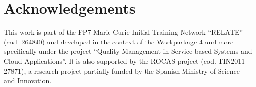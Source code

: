 \documentclass{llncs}
\begin{document}
% 
% 

\section{Acknowledgements}
This work is part of the FP7 Marie Curie Initial Training Network ``RELATE'' (cod. 264840) and developed in the context 
of the Workpackage 4 and more specifically under the project ``Quality Management in Service-based Systems and Cloud Applications''. It is 
also supported by the ROCAS project (cod. TIN2011-27871), a research project partially funded by the Spanish Ministry of Science and Innovation.

\clearpage
\nocite{*}

%

\end{document}
